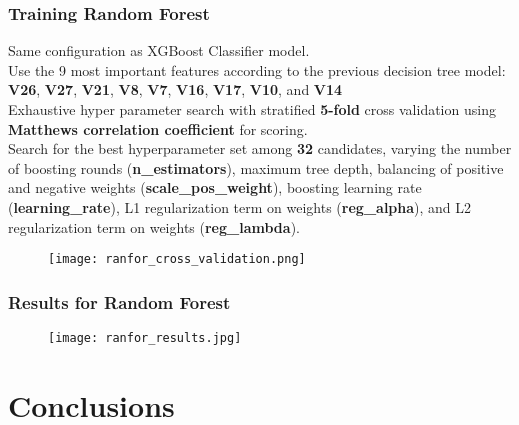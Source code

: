 \documentclass[11pt]{beamer}
\begin{document}
\begin{frame}[fragile]
  \frametitle{\normalsize{\textbf{
    Training Random Forest
  }}} 

  \scriptsize{  

    \textbullet \: Same configuration as XGBoost Classifier model. \\[0.25cm]

    \textbullet \: Use the 9 most important features according to the previous 
    decision tree model: \textbf{V26}, \textbf{V27}, \textbf{V21}, \textbf{V8}, 
    \textbf{V7}, \textbf{V16}, \textbf{V17}, \textbf{V10}, and \textbf{V14} \\[0.25cm]

    \textbullet \: Exhaustive hyper parameter search with stratified \textbf{5-fold} 
    cross validation using \textbf{Matthews correlation coefficient} for scoring. \\[0.25cm]

    \textbullet \: Search for the best hyperparameter set among \textbf{32} candidates, 
    varying the number of boosting rounds (\textbf{n\_estimators}), maximum tree depth, 
    balancing of positive and negative weights 
    (\textbf{scale\_pos\_weight}), boosting learning rate (\textbf{learning\_rate}), 
    L1 regularization term on weights (\textbf{reg\_alpha}), and L2 regularization term 
    on weights (\textbf{reg\_lambda}).

    \begin{figure}[h!]
      \centering
      \texttt{[image: ranfor\_cross\_validation.png]}
    \end{figure}
  }
\end{frame}

\begin{frame}[fragile]
  \frametitle{\normalsize{\textbf{
    Results for Random Forest
  }}} 

  \scriptsize{  

    \begin{figure}[h!]
      \centering
      \texttt{[image: ranfor\_results.jpg]}
    \end{figure}  
  }
\end{frame}

\section{Conclusions}
\end{document}
